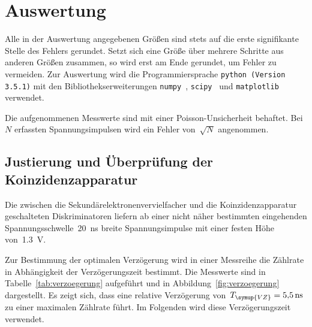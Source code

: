 \section{Auswertung}
\label{sec:auswertung}

Alle in der Auswertung angegebenen Größen sind stets auf die erste signifikante
Stelle des Fehlers gerundet. Setzt sich eine Größe über mehrere Schritte aus
anderen Größen zusammen, so wird erst am Ende gerundet, um Fehler zu vermeiden.
Zur Auswertung wird die Programmiersprache \texttt{python (Version 3.5.1)} mit
den Bibliothekserweiterungen \texttt{numpy}~\cite{numpy},
\texttt{scipy}~\cite{scipy} und \texttt{matplotlib}~\cite{matplotlib} verwendet.

Die aufgenommenen Messwerte sind mit einer Poisson-Unsicherheit behaftet.
Bei~$N$ erfassten Spannungsimpulsen wird ein Fehler von~$\sqrt{N}$ angenommen.

\subsection{Justierung und Überprüfung der Koinzidenzapparatur}

Die zwischen die Sekundärelektronenvervielfacher und die Koinzidenzapparatur
geschalteten Diskriminatoren liefern ab einer nicht näher bestimmten eingehenden
Spannungsschwelle~\SI{20}{\nano\second} breite Spannungsimpulse mit einer festen
Höhe von~\SI{1.3}{\volt}.

Zur Bestimmung der optimalen Verzögerung wird in einer Messreihe die Zählrate in
Abhängigkeit der Verzögerungszeit bestimmt. Die Messwerte sind in
Tabelle~\ref{tab:verzoegerung} aufgeführt und in
Abbildung~\ref{fig:verzoegerung} dargestellt. Es zeigt sich, dass eine relative
Verzögerung von~$T_{\symup{VZ}}=\SI{5.5}{\nano\second}$ zu einer maximalen
Zählrate führt. Im Folgenden wird diese Verzögerungszeit verwendet.

